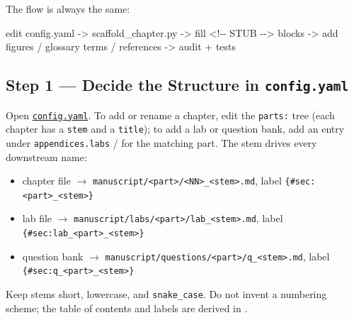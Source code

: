 \documentclass[
]{article}
\newenvironment{Shaded}{}{}
\newcommand{\NormalTok}[1]{#1}
\providecommand{\tightlist}{%
  \setlength{\itemsep}{0pt}\setlength{\parskip}{0pt}}
\theoremstyle{plain}
\theoremstyle{definition}
\begin{document}
The flow is always the same:

\begin{Shaded}
\begin{Highlighting}[]
\NormalTok{edit config.yaml  {-}\textgreater{}  scaffold\_chapter.py  {-}\textgreater{}  fill \textless{}!{-}{-} STUB {-}{-}\textgreater{} blocks}
\NormalTok{      {-}\textgreater{}  add figures / glossary terms / references  {-}\textgreater{}  audit + tests}
\end{Highlighting}
\end{Shaded}

\subsection{\texorpdfstring{Step 1 --- Decide the Structure in
\texttt{config.yaml}}{Step 1 --- Decide the Structure in config.yaml}}\label{step-1-decide-the-structure-in-config.yaml}

Open \href{../config.yaml}{\texttt{config.yaml}}. To add or rename a
chapter, edit the \texttt{parts:} tree (each chapter has a \texttt{stem}
and a \texttt{title}); to add a lab or question bank, add an entry under
\texttt{appendices.labs} /  for the
matching part. The stem drives every downstream name:

\begin{itemize}
\tightlist
\item
  chapter file \texorpdfstring{\ensuremath{\to}}{->}
  \texttt{manuscript/\textless{}part\textgreater{}/\textless{}NN\textgreater{}\_\textless{}stem\textgreater{}.md},
  label
  \texttt{\{\#sec:\textless{}part\textgreater{}\_\textless{}stem\textgreater{}\}}
\item
  lab file \texorpdfstring{\ensuremath{\to}}{->}
  \texttt{manuscript/labs/\textless{}part\textgreater{}/lab\_\textless{}stem\textgreater{}.md},
  label
  \texttt{\{\#sec:lab\_\textless{}part\textgreater{}\_\textless{}stem\textgreater{}\}}
\item
  question bank \texorpdfstring{\ensuremath{\to}}{->}
  \texttt{manuscript/questions/\textless{}part\textgreater{}/q\_\textless{}stem\textgreater{}.md},
  label
  \texttt{\{\#sec:q\_\textless{}part\textgreater{}\_\textless{}stem\textgreater{}\}}
\end{itemize}

Keep stems short, lowercase, and \texttt{snake\_case}. Do not invent a
numbering scheme; the table of contents and labels are derived in
.
\end{document}
